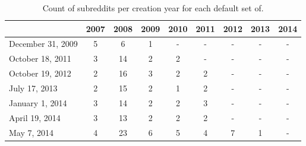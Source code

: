 
\begin{table}[htbp]
\centering
\tabcolsep=0.11cm
\singlespacing
\fontsize{7pt}{8pt}\selectfont
\begin{tabular}{|>{\raggedright\centering\arraybackslash}m{1.5cm}|c|c|c|c|c|c|c|c|}
\hline
 & 2007 & 2008 & 2009 & 2010 & 2011 & 2012 & 2013 & 2014 \\ \hline
December 31, 2009 & 5 & 6 & 1 & - & - & - & - & - \\ \hline
October 18, 2011 & 3 & 14 & 2 & 2 & - & - & - & - \\ \hline
October 19, 2012 & 2 & 16 & 3 & 2 & 2 & - & - & - \\ \hline
July 17, 2013 & 2 & 15 & 2 & 1 & 2 & - & - & - \\ \hline
January 1, 2014 & 3 & 14 & 2 & 2 & 3 & - & - & - \\ \hline
April 19, 2014 & 3 & 13 & 2 & 2 & 2 & - & - & - \\ \hline
May 7, 2014 & 4 & 23 & 6 & 5 & 4 & 7 & 1 & - \\ \hline
\end{tabular}
\caption{Count of subreddits per creation year for each default set of.}
\end{table}


